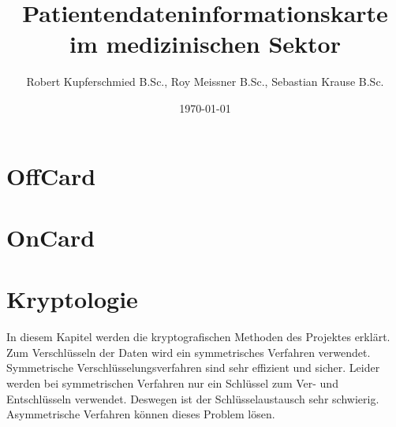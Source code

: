 \documentclass[parskip]{scrartcl}
\begin{document}
\subject{Projektdokumentation im Modul Smartcard}
\title{Patientendateninformationskarte im medizinischen Sektor}
\author{Robert Kupferschmied B.Sc., Roy Meissner B.Sc., Sebastian Krause B.Sc.}
\date{\today}

\maketitle
\onehalfspacing
\section{OffCard}
\section{OnCard}
\section{Kryptologie}
In diesem Kapitel werden die kryptografischen Methoden des Projektes erklärt. Zum Verschlüsseln der Daten wird ein symmetrisches Verfahren verwendet. Symmetrische Verschlüsselungsverfahren sind sehr effizient und sicher. Leider werden bei symmetrischen Verfahren nur ein Schlüssel zum Ver- und Entschlüsseln verwendet. Deswegen ist der Schlüsselaustausch sehr schwierig. Asymmetrische Verfahren können dieses Problem lösen.
\end{document}
